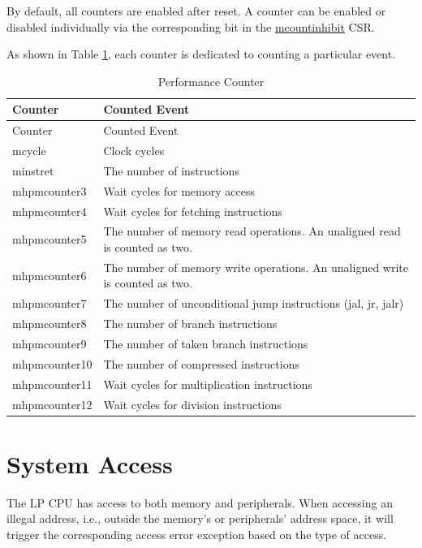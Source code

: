 \documentclass[main\_\_EN.tex]{subfiles}
\begin{document}
By default, all counters are enabled after reset. A counter can be enabled or disabled individually via the corresponding bit in the \hyperref[regdesc:LPMCOUNTINHIBIT]{mcountinhibit} CSR.

As shown in Table \ref{tab:ulp-pccr}, each counter is dedicated to counting a particular event.

\begin{longtable}[c]{|l|l|}
    \caption{Performance Counter}\label{tab:ulp-pccr}\\\hline
    \rowcolor{lightgray}
    Counter & Counted Event \\\hline
    \endfirsthead
    \hline
    \rowcolor{lightgray}
    Counter & Counted Event \\\hline
    \endhead
    \endfoot

    mcycle & Clock cycles \\\hline
    minstret & The number of instructions \\\hline
    mhpmcounter3 & Wait cycles for memory access \\\hline
    mhpmcounter4 & Wait cycles for fetching instructions \\\hline
    mhpmcounter5 & The number of memory read operations. An unaligned read is counted as two.  \\\hline

    mhpmcounter6 & The number of memory write operations. An unaligned write is counted as two. \\\hline
    mhpmcounter7 & The number of unconditional jump instructions (jal, jr, jalr) \\\hline
    mhpmcounter8 & The number of branch instructions \\\hline
    mhpmcounter9 &  The number of taken branch instructions \\\hline
    mhpmcounter10 & The number of compressed instructions \\\hline
    mhpmcounter11 & Wait cycles for multiplication instructions \\\hline
    mhpmcounter12 & Wait cycles for division instructions \\\hline

\end{longtable}

\section{System Access}

The LP CPU has access to both memory and peripherals. When accessing an illegal address, i.e., outside the memory's or peripherals' address space, it will trigger the corresponding access error exception based on the type of access.
\end{document}
